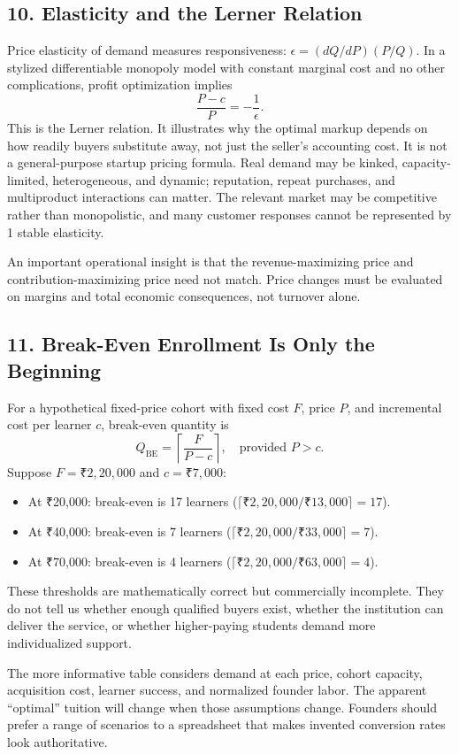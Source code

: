 \subsection*{10. Elasticity and the Lerner Relation}

Price elasticity of demand measures responsiveness: $\epsilon = (dQ/dP)(P/Q)$. In a stylized differentiable monopoly model with constant marginal cost and no other complications, profit optimization implies
\begin{equation}
\frac{P - c}{P} = -\frac{1}{\epsilon}.
\end{equation}
This is the Lerner relation. It illustrates why the optimal markup depends on how readily buyers substitute away, not just the seller's accounting cost. It is not a general-purpose startup pricing formula. Real demand may be kinked, capacity-limited, heterogeneous, and dynamic; reputation, repeat purchases, and multiproduct interactions can matter. The relevant market may be competitive rather than monopolistic, and many customer responses cannot be represented by 1 stable elasticity.

An important operational insight is that the revenue-maximizing price and contribution-maximizing price need not match. Price changes must be evaluated on margins and total economic consequences, not turnover alone.

\subsection*{11. Break-Even Enrollment Is Only the Beginning}

For a hypothetical fixed-price cohort with fixed cost $F$, price $P$, and incremental cost per learner $c$, break-even quantity is
\begin{equation}
Q_{\text{BE}} = \left\lceil \frac{F}{P - c} \right\rceil, \quad \text{provided } P > c.
\end{equation}
Suppose $F = ₹2,20,000$ and $c = ₹7,000$:
\begin{itemize}
  \item At ₹20,000: break-even is 17 learners ($\lceil ₹2,20,000 / ₹13,000 \rceil = 17$).
  \item At ₹40,000: break-even is 7 learners ($\lceil ₹2,20,000 / ₹33,000 \rceil = 7$).
  \item At ₹70,000: break-even is 4 learners ($\lceil ₹2,20,000 / ₹63,000 \rceil = 4$).
\end{itemize}
These thresholds are mathematically correct but commercially incomplete. They do not tell us whether enough qualified buyers exist, whether the institution can deliver the service, or whether higher-paying students demand more individualized support.

The more informative table considers demand at each price, cohort capacity, acquisition cost, learner success, and normalized founder labor. The apparent ``optimal'' tuition will change when those assumptions change. Founders should prefer a range of scenarios to a spreadsheet that makes invented conversion rates look authoritative.
